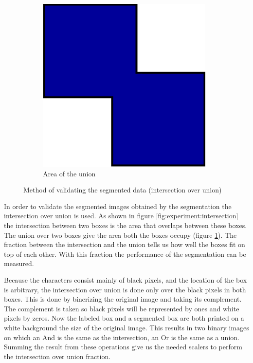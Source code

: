 \begin{figure}[ht]
\begin{subfigure}{0.25\textwidth}
    \includegraphics[width=\textwidth]{./images/experiment/union.png}
    \caption{Area of the union}
    \label{fig:experiment:union}
  \end{subfigure}
  \caption{Method of validating the segmented data (intersection over union)}
  \label{fig:experiment:iou}
\end{figure}

In order to validate the segmented images obtained by the segmentation the intersection over union is used. As shown in figure \ref{fig:experiment:intersection} the intersection between two boxes is the area that overlaps between these boxes. The union over two boxes give the area both the boxes occupy (figure \ref{fig:experiment:union}). The fraction between the intersection and the union tells us how well the boxes fit on top of each other. With this fraction the performance of the segmentation can be measured.

Because the characters consist mainly of black pixels, and the location of the box is arbitrary, the intersection over union is done only over the black pixels in both boxes. This is done by binerizing the original image and taking its complement. The complement is taken so black pixels will be represented by ones and white pixels by zeros. Now the labeled box and a segmented box are both printed on a white background the size of the original image. This results in two binary images on which an And is the same as the intersection, an Or is the same as a union. Summing the result from these operations give us the needed scalers to perform the intersection over union fraction.

